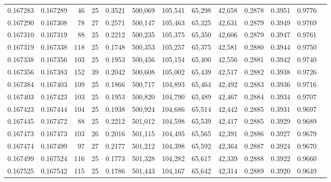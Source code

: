 \begin{tabular}{rrrrrrrrrrrrr}
0.167283 & 0.167289 &  46 &  25 &                                     0.3521 & 500,069 & 105,541 &  65,298 &  42,658 & 0.2878 & 0.3951 & 0.9776 \\
0.167290 & 0.167308 &  78 &  27 &                                     0.2571 & 500,147 & 105,463 &  65,325 &  42,631 & 0.2879 & 0.3949 & 0.9769 \\
0.167310 & 0.167319 &  88 &  25 &                                     0.2212 & 500,235 & 105,375 &  65,350 &  42,606 & 0.2879 & 0.3947 & 0.9761 \\
0.167319 & 0.167338 & 118 &  25 &                                     0.1748 & 500,353 & 105,257 &  65,375 &  42,581 & 0.2880 & 0.3944 & 0.9750 \\
0.167338 & 0.167356 & 103 &  25 &                                     0.1953 & 500,456 & 105,154 &  65,400 &  42,556 & 0.2881 & 0.3942 & 0.9740 \\
0.167356 & 0.167383 & 152 &  39 &                                     0.2042 & 500,608 & 105,002 &  65,439 &  42,517 & 0.2882 & 0.3938 & 0.9726 \\
0.167384 & 0.167403 & 109 &  25 &                                     0.1866 & 500,717 & 104,893 &  65,464 &  42,492 & 0.2883 & 0.3936 & 0.9716 \\
0.167403 & 0.167423 & 103 &  25 &                                     0.1953 & 500,820 & 104,790 &  65,489 &  42,467 & 0.2884 & 0.3934 & 0.9707 \\
0.167423 & 0.167444 & 104 &  25 &                                     0.1938 & 500,924 & 104,686 &  65,514 &  42,442 & 0.2885 & 0.3931 & 0.9697 \\
0.167445 & 0.167472 &  88 &  25 &                                     0.2212 & 501,012 & 104,598 &  65,539 &  42,417 & 0.2885 & 0.3929 & 0.9689 \\
0.167473 & 0.167473 & 103 &  26 &                                     0.2016 & 501,115 & 104,495 &  65,565 &  42,391 & 0.2886 & 0.3927 & 0.9679 \\
0.167474 & 0.167499 &  97 &  27 &                                     0.2177 & 501,212 & 104,398 &  65,592 &  42,364 & 0.2887 & 0.3924 & 0.9670 \\
0.167499 & 0.167524 & 116 &  25 &                                     0.1773 & 501,328 & 104,282 &  65,617 &  42,339 & 0.2888 & 0.3922 & 0.9660 \\
0.167525 & 0.167542 & 115 &  25 &                                     0.1786 & 501,443 & 104,167 &  65,642 &  42,314 & 0.2889 & 0.3920 & 0.9649 \\

\end{tabular}
